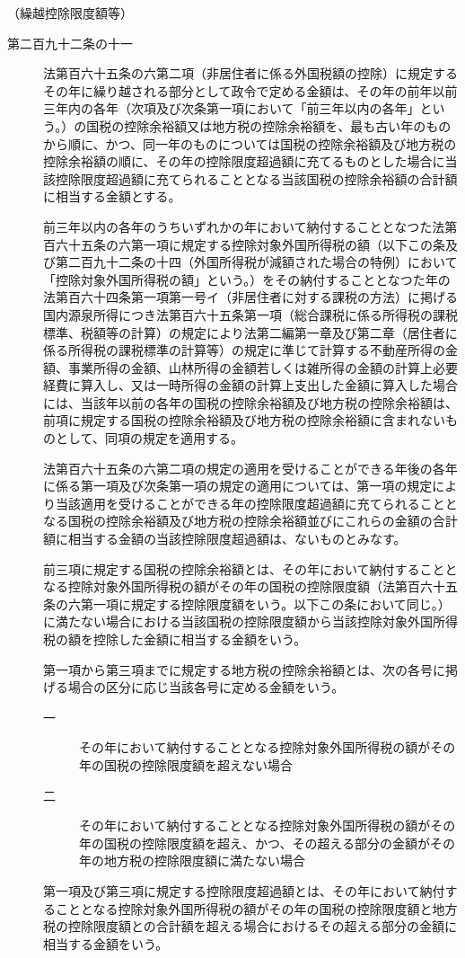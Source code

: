 \documentclass[twocolumn,a4j,10pt]{ltjtarticle}
\begin{document}
\noindent\hspace{10pt}（繰越控除限度額等）
\begin{description}
\item[第二百九十二条の十一]法第百六十五条の六第二項（非居住者に係る外国税額の控除）に規定するその年に繰り越される部分として政令で定める金額は、その年の前年以前三年内の各年（次項及び次条第一項において「前三年以内の各年」という。）の国税の控除余裕額又は地方税の控除余裕額を、最も古い年のものから順に、かつ、同一年のものについては国税の控除余裕額及び地方税の控除余裕額の順に、その年の控除限度超過額に充てるものとした場合に当該控除限度超過額に充てられることとなる当該国税の控除余裕額の合計額に相当する金額とする。
\item[]前三年以内の各年のうちいずれかの年において納付することとなつた法第百六十五条の六第一項に規定する控除対象外国所得税の額（以下この条及び第二百九十二条の十四（外国所得税が減額された場合の特例）において「控除対象外国所得税の額」という。）をその納付することとなつた年の法第百六十四条第一項第一号イ（非居住者に対する課税の方法）に掲げる国内源泉所得につき法第百六十五条第一項（総合課税に係る所得税の課税標準、税額等の計算）の規定により法第二編第一章及び第二章（居住者に係る所得税の課税標準の計算等）の規定に準じて計算する不動産所得の金額、事業所得の金額、山林所得の金額若しくは雑所得の金額の計算上必要経費に算入し、又は一時所得の金額の計算上支出した金額に算入した場合には、当該年以前の各年の国税の控除余裕額及び地方税の控除余裕額は、前項に規定する国税の控除余裕額及び地方税の控除余裕額に含まれないものとして、同項の規定を適用する。
\item[]法第百六十五条の六第二項の規定の適用を受けることができる年後の各年に係る第一項及び次条第一項の規定の適用については、第一項の規定により当該適用を受けることができる年の控除限度超過額に充てられることとなる国税の控除余裕額及び地方税の控除余裕額並びにこれらの金額の合計額に相当する金額の当該控除限度超過額は、ないものとみなす。
\item[]前三項に規定する国税の控除余裕額とは、その年において納付することとなる控除対象外国所得税の額がその年の国税の控除限度額（法第百六十五条の六第一項に規定する控除限度額をいう。以下この条において同じ。）に満たない場合における当該国税の控除限度額から当該控除対象外国所得税の額を控除した金額に相当する金額をいう。
\item[]第一項から第三項までに規定する地方税の控除余裕額とは、次の各号に掲げる場合の区分に応じ当該各号に定める金額をいう。
\begin{description}
\item[一]その年において納付することとなる控除対象外国所得税の額がその年の国税の控除限度額を超えない場合
\item[二]その年において納付することとなる控除対象外国所得税の額がその年の国税の控除限度額を超え、かつ、その超える部分の金額がその年の地方税の控除限度額に満たない場合
\end{description}
\item[]第一項及び第三項に規定する控除限度超過額とは、その年において納付することとなる控除対象外国所得税の額がその年の国税の控除限度額と地方税の控除限度額との合計額を超える場合におけるその超える部分の金額に相当する金額をいう。
\end{description}
\end{document}
